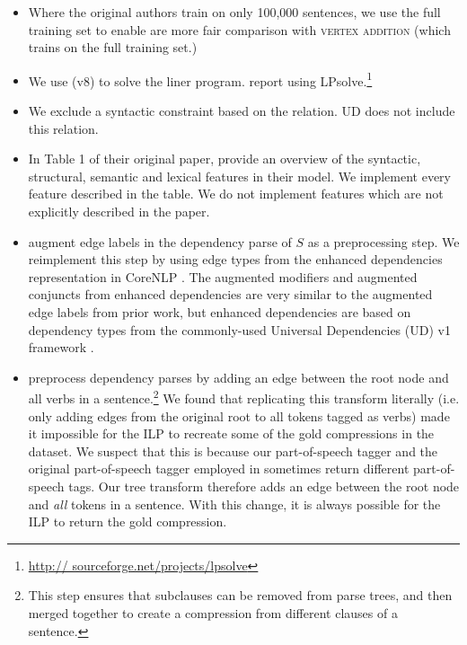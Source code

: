 \begin{itemize}
\item{Where the original authors train on only 100,000 sentences, we use the full training set to enable are more fair comparison with \textsc{vertex addition} (which trains on the full training set.)}
\item{We use \citet{gurobi} (v8) to solve the liner program. \citet{filippova2008dependency} report using LPsolve.\footnote{\url{http://
sourceforge.net/projects/lpsolve}}}
\item{We exclude a syntactic constraint based on the  relation. UD does not include this relation.}
\item{In Table 1 of their original paper, \citet{filippova2013overcoming} provide an overview of the syntactic, structural, semantic and lexical features in their model. We implement every feature described in the table. We do not implement features which are not explicitly described in the paper.}
\item{\citet{filippova2013overcoming} augment edge labels in the dependency parse of $S$ as a preprocessing step. We reimplement this step by using edge types from the enhanced dependencies representation in CoreNLP \cite{Schuster2016EnhancedEU}. The augmented modifiers and augmented conjuncts from enhanced dependencies are very similar to the augmented edge labels from prior work, but enhanced dependencies are based on dependency types from the commonly-used Universal Dependencies (UD) v1 framework \cite{Nivre2016UniversalDV}.}
\item{\citet{filippova2013overcoming} preprocess dependency parses by adding an edge between the root node and all verbs in a sentence.\footnote{This step ensures that subclauses can be removed from parse trees, and then merged together to create a compression from different clauses of a sentence.} We found that replicating this transform literally (i.e. only adding edges from the original root to all tokens tagged as verbs) made it impossible for the ILP to recreate some of the gold compressions in the dataset. We suspect that this is because our part-of-speech tagger and the original part-of-speech tagger employed in \citet{filippova2013overcoming} sometimes return different part-of-speech tags. Our tree transform therefore adds an edge between the root node and \textit{all} tokens in a sentence. With this change, it is always possible for the ILP to return the gold compression.}
\end{itemize}

